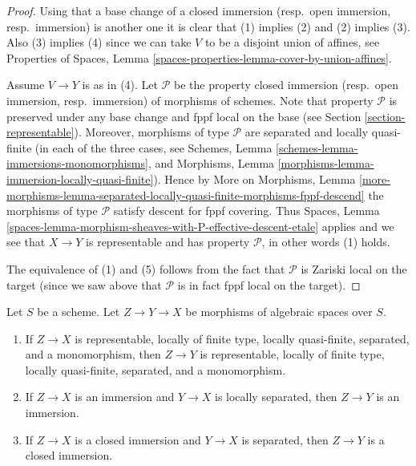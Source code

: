 \begin{proof}
Using that a base change of a
closed immersion (resp.\ open immersion, resp.\ immersion)
is another one it is clear that (1) implies (2) and (2) implies (3).
Also (3) implies (4) since we can take $V$ to be a disjoint union of
affines, see
Properties of Spaces,
Lemma \ref{spaces-properties-lemma-cover-by-union-affines}.

\medskip\noindent
Assume $V \to Y$ is as in (4).
Let $\mathcal{P}$ be the property
closed immersion (resp.\ open immersion, resp.\ immersion)
of morphisms of schemes. Note that property $\mathcal{P}$
is preserved under any base change and fppf local on the
base (see Section \ref{section-representable}).
Moreover, morphisms of type $\mathcal{P}$ are separated and
locally quasi-finite (in each of the three cases, see
Schemes, Lemma \ref{schemes-lemma-immersions-monomorphisms}, and
Morphisms, Lemma \ref{morphisms-lemma-immersion-locally-quasi-finite}).
Hence by
More on Morphisms, Lemma
\ref{more-morphisms-lemma-separated-locally-quasi-finite-morphisms-fppf-descend}
the morphisms of type $\mathcal{P}$ satisfy descent for fppf covering. Thus
Spaces, Lemma \ref{spaces-lemma-morphism-sheaves-with-P-effective-descent-etale}
applies and we see that $X \to Y$ is representable and has property
$\mathcal{P}$, in other words (1) holds.

\medskip\noindent
The equivalence of (1) and (5) follows from the fact that
$\mathcal{P}$ is Zariski local on the target (since we saw
above that $\mathcal{P}$ is in fact fppf local on the target).
\end{proof}

\begin{lemma}
\label{lemma-immersion-permanence}
Let $S$ be a scheme.
Let $Z \to Y \to X$ be morphisms of algebraic spaces over $S$.
\begin{enumerate}
\item If $Z \to X$ is representable, locally of finite type, locally
quasi-finite, separated, and a monomorphism, then $Z \to Y$ is
representable, locally of finite type, locally quasi-finite,
separated, and a monomorphism.
\item If $Z \to X$ is an immersion and $Y \to X$ is locally separated,
then $Z \to Y$ is an immersion.
\item If $Z \to X$ is a closed immersion and $Y \to X$ is separated,
then $Z \to Y$ is a closed immersion.
\end{enumerate}
\end{lemma}

